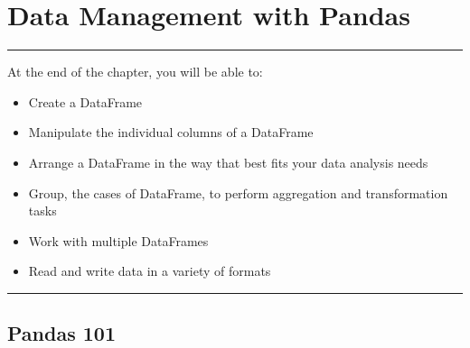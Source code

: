 \documentclass[a4paper,11pt]{book}
\begin{document}
\theendnotes

\chapter{Data Management with Pandas}
\label{ch:data_management}

\par\noindent\rule{\textwidth}{0.4pt}

At the end of the chapter, you will be able to:

\begin{itemize}
	\item Create a DataFrame
	\item Manipulate the individual columns of a DataFrame
	\item Arrange a DataFrame in the way that best fits your data analysis needs
	\item Group, the cases of DataFrame, to perform aggregation and transformation tasks
	\item Work with multiple DataFrames
	\item Read and write data in a variety of formats
\end{itemize}

\par\noindent\rule{\textwidth}{0.4pt}

\section{Pandas 101}
\end{document}
